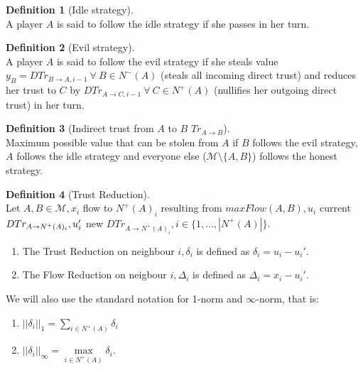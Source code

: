 \documentclass[11pt]{article}
\theoremstyle{definition}
\newtheorem{definition}{Definition}[section]
\theoremstyle{corollary}
\begin{document}
      \begin{definition}[Idle strategy] \ \\
         A player $A$ is said to follow the idle strategy if she passes in her turn.
      \end{definition}
      \begin{definition}[Evil strategy] \ \\
         A player $A$ is said to follow the evil strategy if she steals value $y_B = DTr_{B \rightarrow A, i-1} \:
         \forall \: B \in N^{-}(A)$ (steals all incoming direct trust) and reduces her trust to $C$ by
         $DTr_{A \rightarrow C, i-1} \: \forall \: C \in N^{+}(A)$ (nullifies her outgoing direct trust) in her turn.
      \end{definition}
      \begin{definition}[Indirect trust from $A$ to $B$ $Tr_{A \rightarrow B}$] \ \\
         Maximum possible value that can be stolen from $A$ if $B$ follows the evil strategy, $A$ follows the idle strategy
         and everyone else ($\mathcal{M} \setminus \{A,B\}$) follows the honest strategy.
      \end{definition}
      \begin{definition}[Trust Reduction] \ \\
         Let $A, B \in \mathcal{M}, x_i$ flow to $N^{+}(A)_i$ resulting from $maxFlow(A,B), u_i$ current
         $DTr_{A \rightarrow N^{+}(A)_i}, \\ u_i'$ new $DTr_{A \rightarrow N^{+}(A)_i}, i \in \{1,...,|N^{+}(A)|\}$.
         \begin{enumerate}
            \item The Trust Reduction on neighbour $i, \delta_i$ is defined as $\delta_i = u_i - u_i'$.
            \item The Flow Reduction on neigbour $i, \Delta_i$ is defined as $\Delta_i = x_i - u_i'$.
         \end{enumerate}
         We will also use the standard notation for 1-norm and $\infty$-norm, that is:
         \begin{enumerate}
            \item $||\delta_i||_1 = \sum\limits_{i \in N^{+}(A)}\delta_i$
            \item $||\delta_i||_\infty = \max\limits_{i \in N^{+}(A)}\delta_i$.
         \end{enumerate}
      \end{definition}
\end{document}
